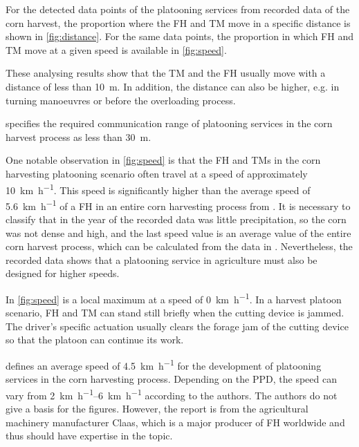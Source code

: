 For the detected data points of the platooning services from recorded data of the corn harvest, the proportion where the \ac{FH} and \ac{TM} move in a specific distance is shown in \autoref{fig:distance}. For the same data points, the proportion in which \ac{FH} and \ac{TM} move at a given speed is available in \autoref{fig:speed}.

These analysing results show that the \ac{TM} and the \ac{FH} usually move with a distance of less than \SI{10}{\metre}. In addition, the distance can also be higher, e.g. in turning manoeuvres or before the overloading process.

\textcite{smolnik_5g_2020} specifies the required communication range of platooning services in the corn harvest process as less than \SI{30}{\metre}.

One notable observation in \autoref{fig:speed} is that the \ac{FH} and \ac{TM}s in the corn harvesting platooning scenario often travel at a speed of approximately \SI{10}{\kilo\metre\per\hour}. This speed is significantly higher than the average speed of \SI{5.6}{\kilo\metre\per\hour} of a \ac{FH} in an entire corn harvesting process from \cite{faustzahlen2018}. It is necessary to classify that in the year of the recorded data was little precipitation, so the corn was not dense and high, and the last speed value is an average value of the entire corn harvest process, which can be calculated from the data in \cite{faustzahlen2018}.
Nevertheless, the recorded data shows that a platooning service in agriculture must also be designed for higher speeds. 

In \autoref{fig:speed} is a local maximum at a speed of \SI{0}{\kilo\metre\per\hour}. In a harvest platoon scenario, \ac{FH} and \ac{TM} can stand still briefly when the cutting device is jammed.
The driver's specific actuation usually clears the forage jam of the cutting device so that the platoon can continue its work.

\textcite{smolnik_5g_2020} defines an average speed of \SI{4.5}{\kilo\metre\per\hour} for the development of platooning services in the corn harvesting process. Depending on the \ac{PPD}, the speed can vary from \SIrange{2}{6}{\kilo\metre\per\hour} according to the authors.
The authors do not give a basis for the figures. However, the report is from the agricultural machinery manufacturer Claas, which is a major producer of \ac{FH} worldwide and thus should have expertise in the topic.

